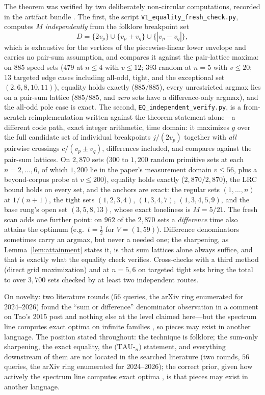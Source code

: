 \documentclass[11pt,a4paper]{article}
\numberwithin{equation}{section}
\theoremstyle{plain}
\theoremstyle{definition}
\theoremstyle{remark}
\begin{document}
The theorem was verified by two deliberately non-circular computations,
recorded in the artifact bundle \cite{prog-artifacts}. The first, the
script \texttt{V1\_equality\_fresh\_check.py}, computes $M$
\emph{independently} from the folklore breakpoint set
\[
D=\{2v_p\}\cup\{v_p+v_q\}\cup\{|v_p-v_q|\},
\]
which is exhaustive for the vertices of the piecewise-linear lower
envelope and carries no pair-sum assumption, and compares it against the
pair-lattice maxima: on $885$ speed sets ($479$ at $n\le 4$ with
$v\le 12$; $393$ random at $n=5$ with $v\le 20$; $13$ targeted edge
cases including all-odd, tight, and the exceptional set
$(2,6,8,10,11)$), equality holds exactly ($885/885$), every unrestricted
argmax lies on a pair-sum lattice ($885/885$, and \emph{zero} sets have
a difference-only argmax), and the all-odd pole case is exact. The
second, \texttt{EQ\_independent\_verify.py}, is a from-scratch
reimplementation written against the theorem statement alone---a
different code path, exact integer arithmetic, time domain: it maximizes
$g$ over the full candidate set of individual breakpoints $j/(2v_p)$
together with \emph{all} pairwise crossings $c/(v_p\pm v_q)$, differences
included, and compares against the pair-sum lattices. On $2{,}870$ sets
($300$ to $1{,}200$ random primitive sets at each $n=2,\dots,6$, of which
$1{,}200$ lie in the paper's measurement domain $v\le 56$, plus a
beyond-corpus probe at $v\le 200$), equality holds exactly
($2{,}870/2{,}870$), the LRC bound holds on every set, and the anchors
are exact: the regular sets $(1,\dots,n)$ at $1/(n{+}1)$, the tight sets
$(1,2,3,4)$, $(1,3,4,7)$, $(1,3,4,5,9)$, and the base rung's open set
$(3,5,8,13)$, whose exact loneliness is $M=5/21$. The fresh scan adds
one further point: on $962$ of the $2{,}870$ sets a \emph{difference}
time also attains the optimum (e.g.\ $t=\tfrac12$ for $V=(1,59)$).
Difference denominators sometimes carry an argmax, but never a needed
one; the sharpening, as Lemma~\ref{lem:attainment} states it, is that
sum lattices alone always suffice, and that is exactly what the
equality check verifies. Cross-checks with a third method (direct grid
maximization) and at $n=5,6$ on targeted tight sets bring the total to
over $3{,}700$ sets checked by at least two independent routes.

On novelty: two literature rounds ($56$ queries, the arXiv ring
enumerated for 2024--2026) found the ``sum or difference'' denominator
observation in a comment on Tao's 2015 post \cite{Tao-blog} and nothing
else at the level claimed here---but the spectrum line computes exact
optima on infinite families \cite{Cordella}, so pieces may exist in
another language. The position stated throughout: the
technique is folklore; the sum-only sharpening, the exact equality, the
$(\mathrm{TAU}$-$_n)$ statement, and everything downstream of them are
not located in the searched literature (two rounds, $56$ queries, the
arXiv ring enumerated for 2024--2026); the correct prior, given how
actively the spectrum line computes exact optima \cite{Cordella}, is
that pieces may exist in another language.
\end{document}
